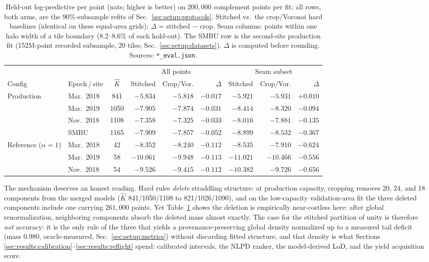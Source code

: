 \begin{table}[!t]
\caption{Held-out log-predictive per point (nats; higher is better) on
$200{,}000$ complement points per fit; all rows, both arms, are the
90\%-subsample refits of Sec.~\ref{sec:setup:protocols}. Stitched vs.\ the crop/Voronoi
hard baselines (identical on these equal-area grids); $\Delta$ =
stitched $-$ crop. Seam columns: points within one halo width of a tile
boundary (8.2--8.6\% of each hold-out). The SMBU row is the
second-site production fit (152M-point recorded subsample, 20 tiles;
Sec.~\ref{sec:setup:datasets}). $\Delta$ is computed before rounding.
Sources: \texttt{*\_eval.json}.}
\label{tab:seam}
\centering
\begin{tabular}{llcrrrrrr}
\hline
 & & & \multicolumn{3}{c}{All points} & \multicolumn{3}{c}{Seam subset} \\
Config & Epoch\,/\,site & $\hat{K}$ & Stitched & Crop/Vor. & $\Delta$ & Stitched & Crop/Vor. & $\Delta$ \\
\hline
Production & Mar.\ 2018 & 841  & $-5.834$ & $-5.818$ & $-0.017$ & $-5.921$ & $-5.931$ & $+0.010$ \\
           & Mar.\ 2019 & 1050 & $-7.905$ & $-7.874$ & $-0.031$ & $-8.414$ & $-8.320$ & $-0.094$ \\
           & Nov.\ 2018 & 1108 & $-7.358$ & $-7.325$ & $-0.033$ & $-8.016$ & $-7.881$ & $-0.135$ \\
           & SMBU       & 1165 & $-7.909$ & $-7.857$ & $-0.052$ & $-8.899$ & $-8.532$ & $-0.367$ \\
\hline
Reference ($\alpha=1$) & Mar.\ 2018 & 42 & $-8.352$ & $-8.240$ & $-0.112$ & $-8.535$ & $-7.910$ & $-0.624$ \\
           & Mar.\ 2019 & 58 & $-10.061$ & $-9.948$  & $-0.113$ & $-11.021$ & $-10.466$ & $-0.556$ \\
           & Nov.\ 2018 & 54 & $-9.526$ & $-9.415$  & $-0.112$ & $-10.382$ & $-9.726$  & $-0.656$ \\
\hline
\end{tabular}
\end{table}

 The mechanism deserves an honest reading. Hard rules \emph{delete}
straddling structure: at production capacity, cropping removes 20, 24,
and 18 components from the merged models ($\hat{K}$ 841/1050/1108 to
821/1026/1090), and on the low-capacity validation-area fit the three
deleted components include one carrying $261{,}000$ points. Yet
Table~\ref{tab:seam} shows the deletion is empirically near-costless
here: after global renormalization, neighboring components absorb the
deleted mass almost exactly. The case for the stitched partition of
unity is therefore \emph{not} accuracy: it is the only rule of the
three that yields a provenance-preserving global density normalized
up to a measured tail deficit (mass $0.980$, oracle-measured,
Sec.~\ref{sec:setup:metrics}) without discarding fitted structure,
and that density is what Sections
\ref{sec:results:calibration}--\ref{sec:results:reflight} spend:
calibrated intervals, the NLPD ranker, the model-derived LoD, and the
yield acquisition score.

